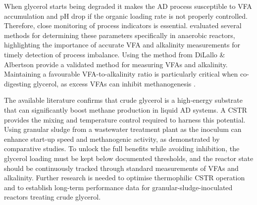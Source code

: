 When glycerol starts being degraded it makes the AD process susceptible to VFA accumulation and pH drop if the organic loading rate is not properly controlled. Therefore, close monitoring of process indicators is essential. \textcite{ribas2007} evaluated several methods for determining these parameters specifically in anaerobic reactors, highlighting the importance of accurate VFA and alkalinity measurements for timely detection of process imbalance. Using the method from DiLallo \& Albertson \parencite{ribas2007} provide a validated method for measuring VFAs and alkalinity. Maintaining a favourable VFA-to-alkalinity ratio is particularly critical when co-digesting glycerol, as excess VFAs can inhibit methanogenesis \parencite{tomczak2025}.

The available literature confirms that crude glycerol is a high-energy substrate that can significantly boost methane production in liquid AD systems. A CSTR provides the mixing and temperature control required to harness this potential. Using granular sludge from a wastewater treatment plant as the inoculum can enhance start-up speed and methanogenic activity, as demonstrated by comparative studies. To unlock the full benefits while avoiding inhibition, the glycerol loading must be kept below documented thresholds, and the reactor state should be continuously tracked through standard measurements of VFAs and alkalinity. Further research is needed to optimise thermophilic CSTR operation and to establish long-term performance data for granular-sludge-inoculated reactors treating crude glycerol.
